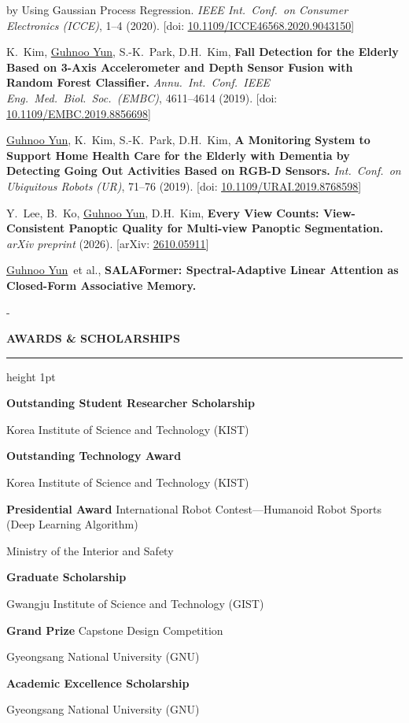 \documentclass[11pt,a4paper]{article}
\makeatletter
\newcommand{\keepspace}[1]{\par\penalty\z@\begingroup\setlength{\dimen@}{#1}%
  \dimen@ii\pagegoal\advance\dimen@ii-\pagetotal
  \ifdim\dimen@>\dimen@ii\ifdim\dimen@ii>\z@\vfill\fi\break\fi\endgroup}
\newcommand{\cvsection}[2][8]{\par\vspace{8pt}\keepspace{#1\baselineskip}%
  {\color{cvblue}\large\bfseries\MakeUppercase{#2}\par}\vspace{3pt}%
  {\color{cvblue}\hrule height 1pt}\vspace{8pt}}
\newlength{\datecol}\setlength{\datecol}{0.95in}
\newlength{\dategap}\setlength{\dategap}{0.16in}
\newenvironment{entries}{\begin{description}[leftmargin=\dimexpr\datecol+\dategap\relax,
    labelwidth=\datecol, labelsep=\dategap, align=right, font=\normalfont,
    itemsep=7pt, topsep=0pt, parsep=0pt, partopsep=0pt, before=\raggedright]}{\end{description}}
\newcommand{\cvsub}[1]{\par\vspace{6pt}{\color{cvblue}\bfseries #1\par}\vspace{2pt}}
\newenvironment{pubs}{\begin{description}[leftmargin=2.6em, labelwidth=2.2em, labelsep=0.4em,
    align=left, font=\normalfont\color{cvblue}\bfseries, itemsep=5pt, topsep=2pt, parsep=0pt,
    before={\raggedright\interlinepenalty=10000}]}%
  {\end{description}}
\newcommand{\pub}[2]{\item[{\raisebox{1.2em}{\hypertarget{pub:#1}{}}[#1]}] #2}
\newcommand{\me}{\uline{Guhnoo Yun}}
\newcommand{\lnk}[2]{\href{#1}{\uline{#2}}}
\newcommand{\doi}[1]{[doi: \lnk{https://doi.org/#1}{#1}]}
\makeatother
\begin{document}
\begin{pubs}
{{    by Using Gaussian Process Regression.} \textit{IEEE Int.\ Conf.\ on Consumer Electronics
    (ICCE)}, 1--4 (2020). \doi{10.1109/ICCE46568.2020.9043150}}
  \pub{8}{K.~Kim, \me, S.-K.~Park, D.H.~Kim, \textbf{Fall Detection for the Elderly Based on 3-Axis
    Accelerometer and Depth Sensor Fusion with Random Forest Classifier.} \textit{Annu.\ Int.\ Conf.\
    IEEE Eng.\ Med.\ Biol.\ Soc.\ (EMBC)}, 4611--4614 (2019). \doi{10.1109/EMBC.2019.8856698}}
  \pub{9}{\me, K.~Kim, S.-K.~Park, D.H.~Kim, \textbf{A Monitoring System to Support Home Health Care
    for the Elderly with Dementia by Detecting Going Out Activities Based on RGB-D Sensors.}
    \textit{Int.\ Conf.\ on Ubiquitous Robots (UR)}, 71--76 (2019).
    \doi{10.1109/URAI.2019.8768598}}
\end{pubs}

\cvsub{Under Review}
\begin{pubs}
  \pub{10}{Y.~Lee, B.~Ko, \me, D.H.~Kim, \textbf{Every View Counts: View-Consistent Panoptic Quality
    for Multi-view Panoptic Segmentation.} \textit{arXiv preprint} (2026).
    [arXiv: \lnk{https://arxiv.org/abs/2610.05911}{2610.05911}]}
\end{pubs}

\cvsub{In Preparation}
\begin{pubs}
  \pub{11}{\me\ et al., \textbf{SALAFormer: Spectral-Adaptive Linear Attention as Closed-Form
    Associative Memory.}}
\end{pubs}

\cvsection{Awards \& Scholarships}
\begin{entries}
  \item[2026] \textbf{Outstanding Student Researcher Scholarship}\par
    Korea Institute of Science and Technology (KIST)
  \item[2023] \textbf{Outstanding Technology Award}\par
    Korea Institute of Science and Technology (KIST)
  \item[2020] \textbf{Presidential Award} International Robot Contest---Humanoid Robot
    Sports (Deep Learning Algorithm)\par
    Ministry of the Interior and Safety
  \item[2016 -- 2017] \textbf{Graduate Scholarship}\par
    Gwangju Institute of Science and Technology (GIST)
  \item[2015] \textbf{Grand Prize} Capstone Design Competition\par
    Gyeongsang National University (GNU)
  \item[2013 -- 2015] \textbf{Academic Excellence Scholarship}\par
    Gyeongsang National University (GNU)
\end{entries}
\end{document}
